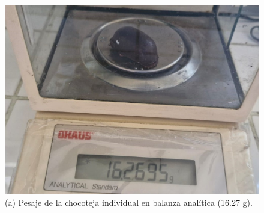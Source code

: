 \documentclass[manuscript,screen,review]{acmart}
\begin{document}
\begin{figure}[H]
  \centering
  \begin{minipage}{0.3\linewidth}
    \centering
    \includegraphics[width=\linewidth]{imagen/densidad 1.jpeg}
    \vspace{1mm}
    \small (a) Pesaje de la chocoteja individual en balanza analítica (16.27 g).
  \end{minipage}
  \hspace{1em}
  \begin{minipage}{0.2\linewidth}
    \centering

\end{minipage}
\end{figure}
\end{document}
